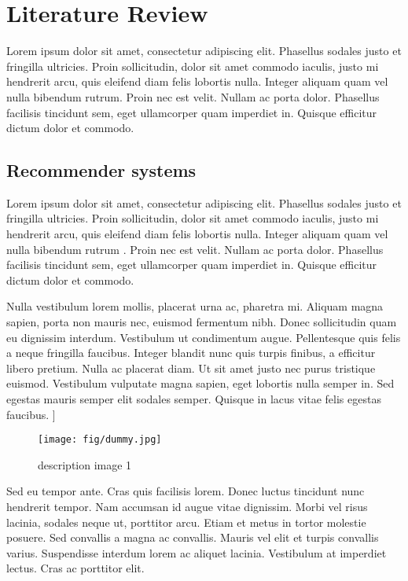 \newcommand{\ASKA}{$\text{ASK}^0$}
\newcommand{\ASKS}{$\text{ASK}^*$}

\chapter{Literature Review}

Lorem ipsum dolor sit amet, consectetur adipiscing elit. Phasellus sodales justo et fringilla ultricies. Proin sollicitudin, dolor sit amet commodo iaculis, justo mi hendrerit arcu, quis eleifend diam felis lobortis nulla. Integer aliquam quam vel nulla bibendum rutrum. Proin nec est velit. Nullam ac porta dolor. Phasellus facilisis tincidunt sem, eget ullamcorper quam imperdiet in. Quisque efficitur dictum dolor et commodo. 

\section{Recommender systems}

Lorem ipsum dolor sit amet, consectetur adipiscing elit. Phasellus sodales justo et fringilla ultricies. Proin sollicitudin, dolor sit amet commodo iaculis, justo mi hendrerit arcu, quis eleifend diam felis lobortis nulla. Integer aliquam quam vel nulla bibendum rutrum \cite{ricci2011introduction}. Proin nec est velit. Nullam ac porta dolor. Phasellus facilisis tincidunt sem, eget ullamcorper quam imperdiet in. Quisque efficitur dictum dolor et commodo. 

Nulla vestibulum lorem mollis, placerat urna ac, pharetra mi. Aliquam magna sapien, porta non mauris nec, euismod fermentum nibh. Donec sollicitudin quam eu dignissim interdum. Vestibulum ut condimentum augue. Pellentesque quis felis a neque fringilla faucibus. Integer blandit nunc quis turpis finibus, a efficitur libero pretium. Nulla ac placerat diam. Ut sit amet justo nec purus tristique euismod. Vestibulum vulputate magna sapien, eget lobortis nulla semper in. Sed egestas mauris semper elit sodales semper. Quisque in lacus vitae felis egestas faucibus. ]


\begin{figure}
       \centering
       \texttt{[image: fig/dummy.jpg]}
       \caption{description image 1}
       \label{image1}
\end{figure}

Sed eu tempor ante. Cras quis facilisis lorem. Donec luctus tincidunt nunc hendrerit tempor. Nam accumsan id augue vitae dignissim. Morbi vel risus lacinia, sodales neque ut, porttitor arcu. Etiam et metus in tortor molestie posuere. Sed convallis a magna ac convallis. Mauris vel elit et turpis convallis varius. Suspendisse interdum lorem ac aliquet lacinia. Vestibulum at imperdiet lectus. Cras ac porttitor elit. 

